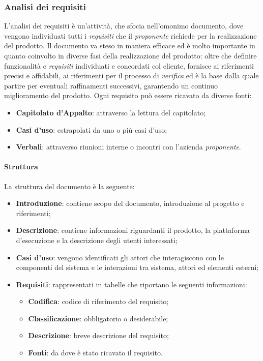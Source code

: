 \subsubsection{Analisi dei requisiti}
L'analisi dei requisiti è un'attività, che sfocia nell'omonimo documento, dove vengono individuati tutti i \emph{requisiti} che il \emph{proponente} richiede per la realizzazione del prodotto.\newline{}
Il documento \AdR{} va steso in maniera efficace ed è molto importante in quanto coinvolto in diverse fasi della realizzazione del prodotto: oltre che definire funzionalità e \emph{requisiti} individuati e concordati col cliente, fornisce ai \progrs{} riferimenti precisi e affidabili, ai \verf{} riferimenti per il processo di \emph{verifica} ed è la base dalla quale partire per eventuali raffinamenti successivi, garantendo un continuo miglioramento del prodotto. 
Ogni requisito può essere ricavato da diverse fonti:
\begin{itemize}
	\item \textbf{Capitolato d'Appalto}: attraverso la lettura del capitolato;
	\item \textbf{Casi d'uso}: estrapolati da uno o più casi d'uso; 
	\item \textbf{Verbali}: attraverso riunioni interne o incontri con l'azienda \emph{proponente}.
\end{itemize}

\paragraph*{Struttura}
\aCapo
La struttura del documento \AdR{} è la seguente:
\begin{itemize}
	\item \textbf{Introduzione}: contiene scopo del documento, introduzione al progetto e riferimenti;
	\item \textbf{Descrizione}: contiene informazioni riguardanti il prodotto, la piattaforma d'esecuzione e la descrizione degli utenti interessati;
	\item \textbf{Casi d'uso}: vengono identificati gli attori che interagiscono con le componenti del sistema e le interazioni tra sistema, attori ed elementi esterni;
	\item \textbf{Requisiti}: rappresentati in tabelle che riportano le seguenti informazioni:
		\begin{itemize}
			\item \textbf{Codifica}: codice di riferimento del requisito;
			\item \textbf{Classificazione}: obbligatorio o desiderabile;
			\item \textbf{Descrizione}: breve descrizione del requisito;
			\item \textbf{Fonti}: da dove è stato ricavato il requisito.
		\end{itemize}
\end{itemize}

